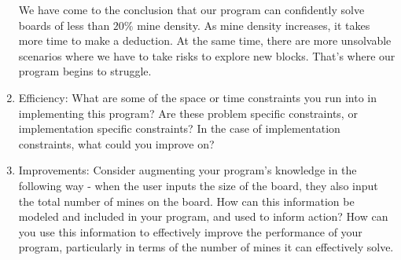 \documentclass[letter]{article}
\begin{document}
\begin{enumerate}
	We have come to the conclusion that our program can confidently solve boards of less than $ 20\% $ mine density. 
	As mine density increases, it takes more time to make a deduction. At the same time, there are more unsolvable scenarios where we have to take risks to explore new blocks. That’s where our program begins to struggle.
	
	\item {Efficiency: What are some of the space or time constraints you run into in implementing this program? Are these problem specific constraints, or implementation specific constraints? In the case of implementation constraints, what could you improve on?} \\
	\item {Improvements: Consider augmenting your program’s knowledge in the following way - when the user inputs the size of the board, they also input the total number of mines on the board. How can this information be modeled and included in your program, and used to inform action? How can you use this information to effectively improve the performance of your program, particularly in terms of the number of mines it can effectively solve.} 
\end{enumerate}
\end{document}
